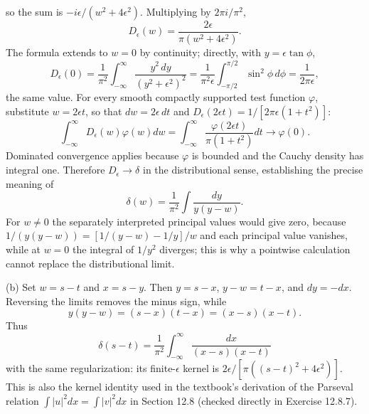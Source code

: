 so the sum is $-i\epsilon/(w^2+4\epsilon^2)$. Multiplying by
$2\pi i/\pi^2$,
\[
\boxed{D_\epsilon(w)=\frac{2\epsilon}{\pi(w^2+4\epsilon^2)}}.
\]
The formula extends to $w=0$ by continuity; directly, with
$y=\epsilon\tan\phi$,
\[
D_\epsilon(0)=\frac1{\pi^2}\int_{-\infty}^{\infty}
\frac{y^2\,dy}{(y^2+\epsilon^2)^2}
=\frac1{\pi^2\epsilon}\int_{-\pi/2}^{\pi/2}\sin^2\phi\,d\phi
=\frac1{2\pi\epsilon},
\]
the same value. For every smooth compactly
supported test function $\varphi$, substitute $w=2\epsilon t$, so that
$dw=2\epsilon\,dt$ and $D_\epsilon(2\epsilon t)=1/[2\pi\epsilon(1+t^2)]$:
\[
\int_{-\infty}^{\infty}D_\epsilon(w)\varphi(w)dw
=\int_{-\infty}^{\infty}\frac{\varphi(2\epsilon t)}{\pi(1+t^2)}dt
\longrightarrow\varphi(0).
\]
Dominated convergence applies because $\varphi$ is bounded and the
Cauchy density has integral one. Therefore $D_\epsilon\to\delta$ in
the distributional sense, establishing the precise meaning of
\[
\boxed{\delta(w)=\frac1{\pi^2}\int\frac{dy}{y(y-w)}}.
\]
For $w\ne0$ the separately interpreted principal values would give
zero, because $1/(y(y-w))=[1/(y-w)-1/y]/w$ and each principal value
vanishes, while at $w=0$ the integral of $1/y^2$ diverges; this is why a
pointwise calculation cannot replace the distributional limit.

(b) Set $w=s-t$ and $x=s-y$. Then $y=s-x$, $y-w=t-x$, and
$dy=-dx$. Reversing the limits removes the minus sign, while
\[
y(y-w)=(s-x)(t-x)=(x-s)(x-t).
\]
Thus
\[
\boxed{\delta(s-t)=\frac1{\pi^2}
\int_{-\infty}^{\infty}\frac{dx}{(x-s)(x-t)}}
\]
with the same regularization: its finite-$\epsilon$ kernel is
$2\epsilon/[\pi((s-t)^2+4\epsilon^2)]$. This is also the kernel
identity used in the textbook's derivation of the Parseval relation
$\int|u|^2dx=\int|v|^2dx$ in Section 12.8 (checked directly in
Exercise 12.8.7).
